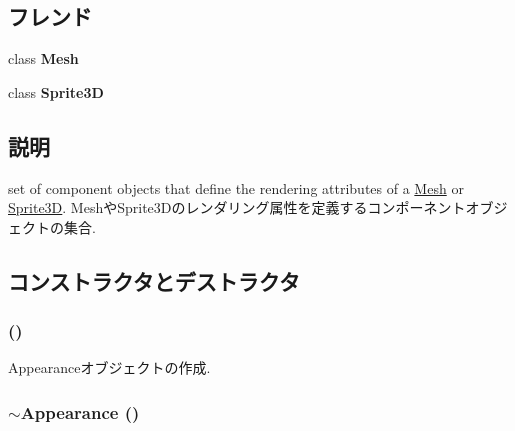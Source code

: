 \subsection*{フレンド}
\begin{CompactItemize}
\item 
\hypertarget{classm3g_1_1Appearance_a41a130f156b145bffb3f4b5172c4c93}{
class \textbf{Mesh}}
\label{classm3g_1_1Appearance_a41a130f156b145bffb3f4b5172c4c93}

\item 
\hypertarget{classm3g_1_1Appearance_639cf38c41878a4f0fc8d24c010c96de}{
class \textbf{Sprite3D}}
\label{classm3g_1_1Appearance_639cf38c41878a4f0fc8d24c010c96de}

\end{CompactItemize}


\subsection{説明}
set of component objects that define the rendering attributes of a \hyperlink{classm3g_1_1Mesh}{Mesh} or \hyperlink{classm3g_1_1Sprite3D}{Sprite3D}. MeshやSprite3Dのレンダリング属性を定義するコンポーネントオブジェクトの集合. 

\subsection{コンストラクタとデストラクタ}
\hypertarget{classm3g_1_1Appearance_2e594c7b96cb5cfad839a98b57f5d42f}{
\subsubsection[{Appearance}]{ ()}}
\label{classm3g_1_1Appearance_2e594c7b96cb5cfad839a98b57f5d42f}


Appearanceオブジェクトの作成. \hypertarget{classm3g_1_1Appearance_c05c93d7a0f286cb9471b6c667ffeee1}{
\subsubsection[{$\sim$Appearance}]{\setlength{\rightskip}{0pt plus 5cm}$\sim${\bf Appearance} ()}}
\label{classm3g_1_1Appearance_c05c93d7a0f286cb9471b6c667ffeee1}



